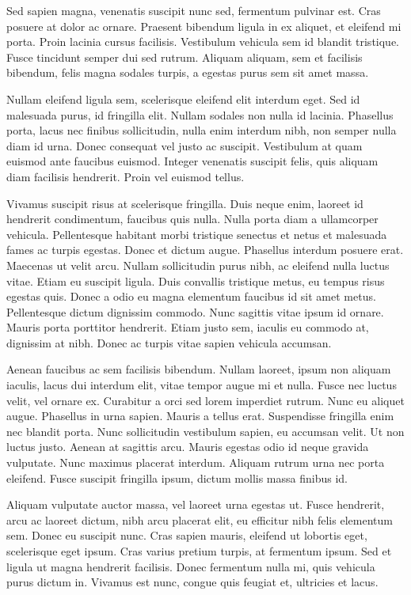 Sed sapien magna, venenatis suscipit nunc sed, fermentum pulvinar est. Cras posuere at dolor ac ornare. Praesent bibendum ligula in ex aliquet, et eleifend mi porta. Proin lacinia cursus facilisis. Vestibulum vehicula sem id blandit tristique. Fusce tincidunt semper dui sed rutrum. Aliquam aliquam, sem et facilisis bibendum, felis magna sodales turpis, a egestas purus sem sit amet massa.

Nullam eleifend ligula sem, scelerisque eleifend elit interdum eget. Sed id malesuada purus, id fringilla elit. Nullam sodales non nulla id lacinia. Phasellus porta, lacus nec finibus sollicitudin, nulla enim interdum nibh, non semper nulla diam id urna. Donec consequat vel justo ac suscipit. Vestibulum at quam euismod ante faucibus euismod. Integer venenatis suscipit felis, quis aliquam diam facilisis hendrerit. Proin vel euismod tellus.

Vivamus suscipit risus at scelerisque fringilla. Duis neque enim, laoreet id hendrerit condimentum, faucibus quis nulla. Nulla porta diam a ullamcorper vehicula. Pellentesque habitant morbi tristique senectus et netus et malesuada fames ac turpis egestas. Donec et dictum augue. Phasellus interdum posuere erat. Maecenas ut velit arcu. Nullam sollicitudin purus nibh, ac eleifend nulla luctus vitae. Etiam eu suscipit ligula. Duis convallis tristique metus, eu tempus risus egestas quis. Donec a odio eu magna elementum faucibus id sit amet metus. Pellentesque dictum dignissim commodo. Nunc sagittis vitae ipsum id ornare. Mauris porta porttitor hendrerit. Etiam justo sem, iaculis eu commodo at, dignissim at nibh. Donec ac turpis vitae sapien vehicula accumsan.

Aenean faucibus ac sem facilisis bibendum. Nullam laoreet, ipsum non aliquam iaculis, lacus dui interdum elit, vitae tempor augue mi et nulla. Fusce nec luctus velit, vel ornare ex. Curabitur a orci sed lorem imperdiet rutrum. Nunc eu aliquet augue. Phasellus in urna sapien. Mauris a tellus erat. Suspendisse fringilla enim nec blandit porta. Nunc sollicitudin vestibulum sapien, eu accumsan velit. Ut non luctus justo. Aenean at sagittis arcu. Mauris egestas odio id neque gravida vulputate. Nunc maximus placerat interdum. Aliquam rutrum urna nec porta eleifend. Fusce suscipit fringilla ipsum, dictum mollis massa finibus id.

Aliquam vulputate auctor massa, vel laoreet urna egestas ut. Fusce hendrerit, arcu ac laoreet dictum, nibh arcu placerat elit, eu efficitur nibh felis elementum sem. Donec eu suscipit nunc. Cras sapien mauris, eleifend ut lobortis eget, scelerisque eget ipsum. Cras varius pretium turpis, at fermentum ipsum. Sed et ligula ut magna hendrerit facilisis. Donec fermentum nulla mi, quis vehicula purus dictum in. Vivamus est nunc, congue quis feugiat et, ultricies et lacus.

